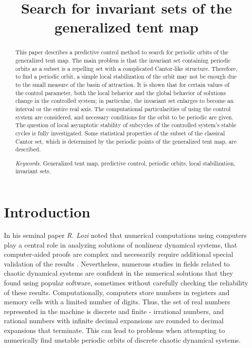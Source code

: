 \documentclass[12pt,a4paper]{amsart}
\begin{document}
\title{Search for invariant sets of the generalized tent map}

\begin{abstract}
This paper describes a predictive control method to search for periodic orbits of the generalized tent map. The main problem is that 
the invariant set containing periodic orbits as a subset is a repelling set with a complicated Cantor-like structure.  Therefore, to find a periodic orbit,
a simple local stabilization of the orbit may not be enough due to the small measure of the basin of attraction. It is shown that for 
certain values of the control parameter, both the local behavior and the global behavior of solutions change in the controlled system; in particular, the invariant set enlarges to become an interval or the entire real axis.  The computational particularities of using the control system 
are considered, and necessary conditions for the orbit to be periodic are given. The question of local asymptotic stability of 
subcycles of the controlled system's stable cycles is fully investigated. Some statistical properties of the subset of the classical 
Cantor set, which is determined by the periodic points of the generalized tent map, are described.

\medskip
\noindent \textit{Keywords.} Generalized tent map, predictive control, periodic orbits, local stabilization, invariant sets.  
\end{abstract}


\maketitle

\section*{Introduction}

In his seminal paper \textit{R. Lozi} noted that numerical computations using computers play a central role in analyzing 
solutions of nonlinear dynamical systems, that computer-aided proofs are complex and necessarily require additional special 
validation of the results \cite{Lozi}. Nevertheless, numerous studies in fields related to chaotic dynamical systems are confident 
in the numerical solutions that they found using popular software, sometimes without carefully checking the reliability of these results.
Computationally, computers store numbers in registers and memory cells with a limited number of digits.  Thus, the set of real numbers represented in the machine is discrete and finite - irrational numbers, and rational numbers with infinite decimal expansions are rounded to decimal expansions that terminate.  This can lead to problems when attempting to numerically find unstable periodic orbits of discrete chaotic dynamical systems.  
\end{document}
